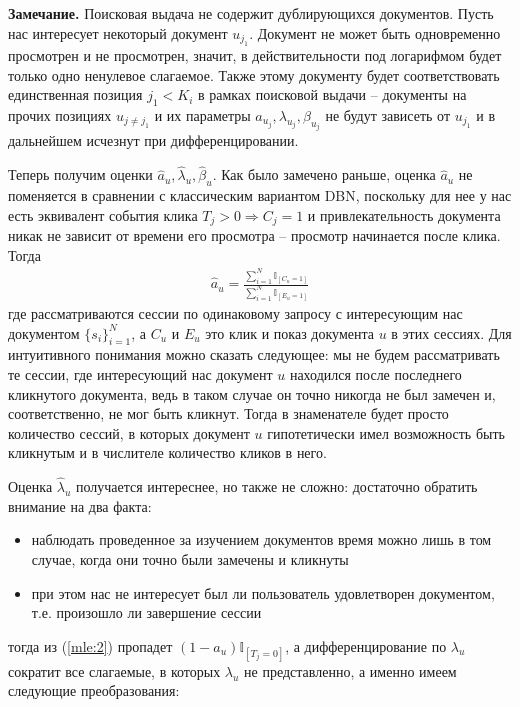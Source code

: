 \documentclass[diploma]{nanolab2015}
\begin{document}
\textbf{Замечание.} Поисковая выдача не содержит дублирующихся документов. Пусть нас интересует некоторый документ $u_{j_1}$. Документ не может быть одновременно просмотрен и не просмотрен, значит, в действительности под логарифмом будет только одно ненулевое слагаемое. Также этому документу будет соответствовать единственная позиция $j_1 < K_i$ в рамках поисковой выдачи -- документы на прочих позициях $u_{j \neq j_1}$ и их параметры $a_{u_j}, \lambda_{u_j}, \beta_{u_j}$ не будут зависеть от $u_{j_1}$ и в дальнейшем исчезнут при дифференцировании.    


Теперь получим оценки $\hat{a}_u, \hat{\lambda}_u, \hat{\beta}_u$. Как было замечено раньше, оценка $\hat{a}_u$ не поменяется в сравнении с классическим вариантом DBN, поскольку для нее у нас есть эквивалент события клика $T_j > 0 \Rightarrow C_j = 1$ и привлекательность документа никак не зависит от времени его просмотра -- просмотр начинается после клика. Тогда
\begin{align}
    \hat{a}_u = \frac{\sum\limits_{i=1}^{N}\mathbb{I}_{[C_u = 1]}}{\sum\limits_{i=1}^{N}\mathbb{I}_{[E_u = 1]}} 
\end{align}
где рассматриваются сессии по одинаковому запросу с интересующим нас документом $\{s_i\}_{i=1}^{N}$, а $C_u$ и $E_u$ это клик и показ документа $u$ в этих сессиях. Для интуитивного понимания можно сказать следующее: мы не будем рассматривать те сессии, где интересующий нас документ $u$ находился после последнего кликнутого документа, ведь в таком случае он точно никогда не был замечен и, соответственно, не мог быть кликнут. Тогда в знаменателе будет просто количество сессий, в которых документ $u$ гипотетически имел возможность быть кликнутым и в числителе количество кликов в него.

Оценка $\hat{\lambda}_u$ получается интереснее, но также не сложно: достаточно обратить внимание на два факта:
\begin{itemize}
    \item наблюдать проведенное за изучением документов время можно лишь в том случае, когда они точно были замечены и кликнуты
    \item при этом нас не интересует был ли пользователь удовлетворен документом, т.е. произошло ли завершение сессии
\end{itemize}

тогда из (\ref{mle:2}) пропадет $(1-a_u)\mathbb{I}_{[T_j=0]}$, а дифференцирование по $\lambda_u$ сократит все слагаемые, в которых $\lambda_u$ не представленно, а именно имеем следующие преобразования:
\end{document}
